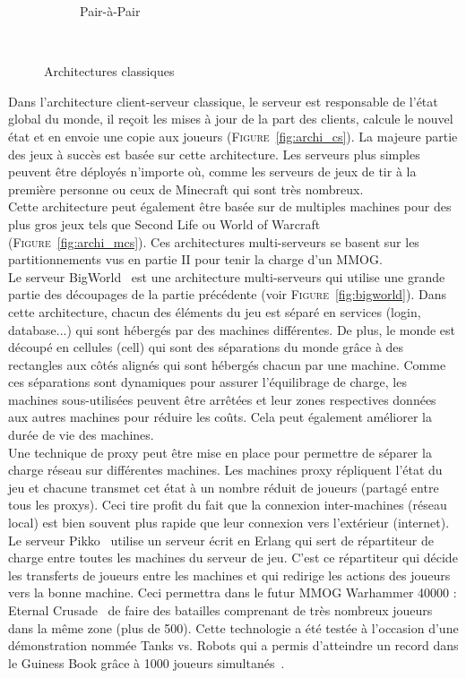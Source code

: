 \begin{figure}[b!]
\begin{subfigure}[t]{0.3\textwidth}
			\caption{Pair-à-Pair}
			\label{fig:archi_p2p}
		\end{subfigure}
		\\[0.2cm]
	\caption{Architectures classiques}
	\label{fig:archi}
\end{figure}
Dans l'architecture client-serveur classique, le serveur est responsable de l'état global du monde, il reçoit les mises à jour de la part des clients, calcule le nouvel état et en envoie une copie aux joueurs (\textsc{Figure}~\ref{fig:archi_cs}). La majeure partie des jeux à succès est basée sur cette architecture. Les serveurs plus simples peuvent être déployés n'importe où, comme les serveurs de jeux de tir à la première personne ou ceux de Minecraft qui sont très nombreux.\\

Cette architecture peut également être basée sur de multiples machines pour des plus gros jeux tels que Second Life ou World of Warcraft (\textsc{Figure}~\ref{fig:archi_mcs}). Ces architectures multi-serveurs se basent sur les partitionnements vus en partie II pour tenir la charge d'un MMOG.\\

Le serveur BigWorld~\cite{bigworld} est une architecture multi-serveurs qui utilise une grande partie des découpages de la partie précédente (voir \textsc{Figure}~\ref{fig:bigworld}). Dans cette architecture, chacun des éléments du jeu est séparé en services (login, database...) qui sont hébergés par des machines différentes. De plus, le monde est découpé en cellules (cell) qui sont des séparations du monde grâce à des rectangles aux côtés alignés qui sont hébergés chacun par une machine. Comme ces séparations sont dynamiques pour assurer l'équilibrage de charge, les machines sous-utilisées peuvent être arrêtées et leur zones respectives données aux autres machines pour réduire les coûts. Cela peut également améliorer la durée de vie des machines.\\

Une technique de proxy peut être mise en place pour permettre de séparer la charge réseau sur différentes machines. Les machines proxy répliquent l'état du jeu et chacune transmet cet état à un nombre réduit de joueurs (partagé entre tous les proxys). Ceci tire profit du fait que la connexion inter-machines (réseau local) est bien souvent plus rapide que leur connexion vers l'extérieur (internet).\\

Le serveur Pikko~\cite{pikko} utilise un serveur écrit en Erlang qui sert de répartiteur de charge entre toutes les machines du serveur de jeu. C'est ce répartiteur qui décide les transferts de joueurs entre les machines et qui redirige les actions des joueurs vers la bonne machine. Ceci permettra dans le futur MMOG Warhammer 40000 : Eternal Crusade~\cite{wh40kEC} de faire des batailles comprenant de très nombreux joueurs dans la même zone (plus de 500). Cette technologie a été testée à l'occasion d'une démonstration nommée Tanks vs. Robots qui a permis d'atteindre un record dans le Guiness Book grâce à 1000 joueurs simultanés~\cite{tanks_vs_robots}.


